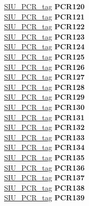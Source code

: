 \begin{DoxyCompactItemize}
\begin{tabbing}
\>\>\mbox{\hyperlink{unionSIU__tag_1_1SIU__PCR__tag}{SIU\_PCR\_tag}} {\bfseries PCR120}\\
\>\>\mbox{\hyperlink{unionSIU__tag_1_1SIU__PCR__tag}{SIU\_PCR\_tag}} {\bfseries PCR121}\\
\>\>\mbox{\hyperlink{unionSIU__tag_1_1SIU__PCR__tag}{SIU\_PCR\_tag}} {\bfseries PCR122}\\
\>\>\mbox{\hyperlink{unionSIU__tag_1_1SIU__PCR__tag}{SIU\_PCR\_tag}} {\bfseries PCR123}\\
\>\>\mbox{\hyperlink{unionSIU__tag_1_1SIU__PCR__tag}{SIU\_PCR\_tag}} {\bfseries PCR124}\\
\>\>\mbox{\hyperlink{unionSIU__tag_1_1SIU__PCR__tag}{SIU\_PCR\_tag}} {\bfseries PCR125}\\
\>\>\mbox{\hyperlink{unionSIU__tag_1_1SIU__PCR__tag}{SIU\_PCR\_tag}} {\bfseries PCR126}\\
\>\>\mbox{\hyperlink{unionSIU__tag_1_1SIU__PCR__tag}{SIU\_PCR\_tag}} {\bfseries PCR127}\\
\>\>\mbox{\hyperlink{unionSIU__tag_1_1SIU__PCR__tag}{SIU\_PCR\_tag}} {\bfseries PCR128}\\
\>\>\mbox{\hyperlink{unionSIU__tag_1_1SIU__PCR__tag}{SIU\_PCR\_tag}} {\bfseries PCR129}\\
\>\>\mbox{\hyperlink{unionSIU__tag_1_1SIU__PCR__tag}{SIU\_PCR\_tag}} {\bfseries PCR130}\\
\>\>\mbox{\hyperlink{unionSIU__tag_1_1SIU__PCR__tag}{SIU\_PCR\_tag}} {\bfseries PCR131}\\
\>\>\mbox{\hyperlink{unionSIU__tag_1_1SIU__PCR__tag}{SIU\_PCR\_tag}} {\bfseries PCR132}\\
\>\>\mbox{\hyperlink{unionSIU__tag_1_1SIU__PCR__tag}{SIU\_PCR\_tag}} {\bfseries PCR133}\\
\>\>\mbox{\hyperlink{unionSIU__tag_1_1SIU__PCR__tag}{SIU\_PCR\_tag}} {\bfseries PCR134}\\
\>\>\mbox{\hyperlink{unionSIU__tag_1_1SIU__PCR__tag}{SIU\_PCR\_tag}} {\bfseries PCR135}\\
\>\>\mbox{\hyperlink{unionSIU__tag_1_1SIU__PCR__tag}{SIU\_PCR\_tag}} {\bfseries PCR136}\\
\>\>\mbox{\hyperlink{unionSIU__tag_1_1SIU__PCR__tag}{SIU\_PCR\_tag}} {\bfseries PCR137}\\
\>\>\mbox{\hyperlink{unionSIU__tag_1_1SIU__PCR__tag}{SIU\_PCR\_tag}} {\bfseries PCR138}\\
\>\>\mbox{\hyperlink{unionSIU__tag_1_1SIU__PCR__tag}{SIU\_PCR\_tag}} {\bfseries PCR139}\\

\end{tabbing}
\end{DoxyCompactItemize}
